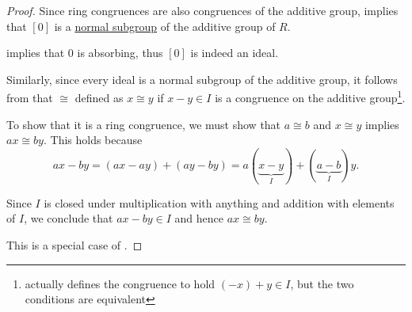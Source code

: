 \begin{proof}
   Since ring congruences are also congruences of the additive group,  implies that \( [0] \) is a \hyperref[def:normal_subgroup]{normal subgroup} of the additive group of \( R \).

   implies that \( 0 \) is absorbing, thus \( [0] \) is indeed an ideal.

   Similarly, since every ideal is a normal subgroup of the additive group, it follows from  that \( {\cong} \) defined as \( x \cong y \) if \( x - y \in I \) is a congruence on the additive group\footnote{ actually defines the congruence to hold \( (-x) + y \in I \), but the two conditions are equivalent}.

  To show that it is a ring congruence, we must show that \( a \cong b \) and \( x \cong y \) implies \( ax \cong by \). This holds because
  \begin{equation*}
    ax - by
    =
    (ax - ay) + (ay - by)
    =
    a(\underbrace{x - y}_{I}) + (\underbrace{a - b}_{I})y.
  \end{equation*}

  Since \( I \) is closed under multiplication with anything and addition with elements of \( I \), we conclude that \( ax - by \in I \) and hence \( ax \cong by \).

   This is a special case of .
\end{proof}

